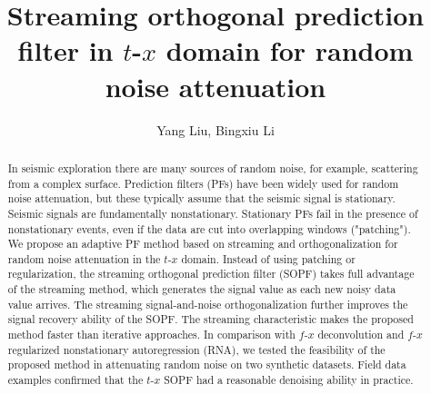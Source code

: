 
\title{Streaming orthogonal prediction filter in $t$-$x$ domain for random noise attenuation}

\renewcommand{\thefootnote}{\fnsymbol{footnote}}


\address{
\footnotemark[1] College of Geo-exploration Science and Technology,\\
Jilin University, Changchun, China \\
\footnotemark[2] Formerly College of Geo-exploration Science and Technology,\\
Jilin University, Changchun, China; \\
presently China Railway Design Corporation, Tianjin, China}

\author{Yang Liu\footnotemark[1], Bingxiu Li\footnotemark[2]}


\maketitle

\begin{abstract}
In seismic exploration there are many sources of random noise, for
example, scattering from a complex surface. Prediction filters (PFs)
have been widely used for random noise attenuation, but these
typically assume that the seismic signal is stationary. Seismic
signals are fundamentally nonstationary. Stationary PFs fail in the
presence of nonstationary events, even if the data are cut into
overlapping windows ("patching"). We propose an adaptive PF method
based on streaming and orthogonalization for random noise attenuation
in the $t$-$x$ domain. Instead of using patching or regularization,
the streaming orthogonal prediction filter (SOPF) takes full advantage
of the streaming method, which generates the signal value as each new
noisy data value arrives. The streaming signal-and-noise
orthogonalization further improves the signal recovery ability of the
SOPF. The streaming characteristic makes the proposed method faster
than iterative approaches. In comparison with $f$-$x$ deconvolution
and $f$-$x$ regularized nonstationary autoregression (RNA), we tested
the feasibility of the proposed method in attenuating random noise on
two synthetic datasets. Field data examples confirmed that the $t$-$x$
SOPF had a reasonable denoising ability in practice.
\end{abstract}

